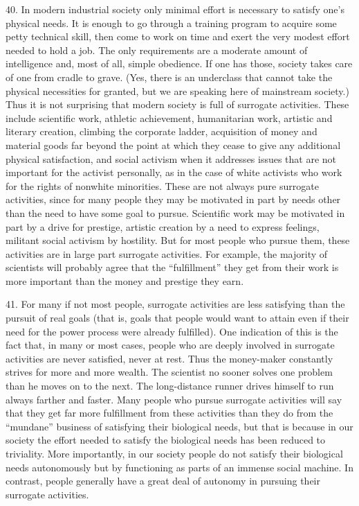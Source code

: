 \documentclass{article}
\begin{document}
40. In modern industrial society only minimal effort is necessary to satisfy one’s physical 
needs. It is enough to go through a training program to acquire some petty technical skill, then 
come to work on time and exert the very modest effort needed to hold a job. The only requirements 
are a moderate amount of intelligence and, most of all, simple obedience. If one has those, society 
takes care of one from cradle to grave. (Yes, there is an underclass that cannot take the physical 
necessities for granted, but we are speaking here of mainstream society.) Thus it is not surprising 
that modern society is full of surrogate activities. These include scientific work, athletic 
achievement, humanitarian work, artistic and literary creation, climbing the corporate ladder, 
acquisition of money and material goods far beyond the point at which they cease to give any 
additional physical satisfaction, and social activism when it addresses issues that are not important 
for the activist personally, as in the case of white activists who work for the rights of nonwhite 
minorities. These are not always pure surrogate activities, since for many people they may be 
motivated in part by needs other than the need to have some goal to pursue. Scientific work may 
be motivated in part by a drive for prestige, artistic creation by a need to express feelings, militant 
social activism by hostility. But for most people who pursue them, these activities are in large part 
surrogate activities. For example, the majority of scientists will probably agree that the 
“fulfillment” they get from their work is more important than the money and prestige they earn. \vspace{\baselineskip}

41. For many if not most people, surrogate activities are less satisfying than the pursuit of real 
goals (that is, goals that people would want to attain even if their need for the power process were 
already fulfilled). One indication of this is the fact that, in many or most cases, people who are 
deeply involved in surrogate activities are never satisfied, never at rest. Thus the money-maker 
constantly strives for more and more wealth. The scientist no sooner solves one problem than he 
moves on to the next. The long-distance runner drives himself to run always farther and 
faster. Many people who pursue surrogate activities will say that they get far more fulfillment 
from these activities than they do from the “mundane” business of satisfying their biological needs, 
but that is because in our society the effort needed to satisfy the biological needs has been reduced 
to triviality. More importantly, in our society people do not satisfy their biological needs 
autonomously but by functioning as parts of an immense social machine. In contrast, people 
generally have a great deal of autonomy in pursuing their surrogate activities. 
\end{document}
